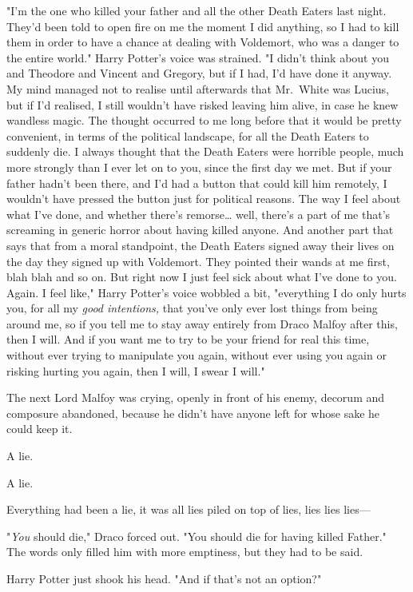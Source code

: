 "I'm the one who killed your father and all the other Death Eaters last night.
They'd been told to open fire on me the moment I did anything, so I had to kill
them in order to have a chance at dealing with Voldemort, who was a danger to
the entire world." Harry Potter's voice was strained. "I didn't think about you
and Theodore and Vincent and Gregory, but if I had, I'd have done it anyway. My
mind managed not to realise until afterwards that Mr.~White was Lucius, but if
I'd realised, I still wouldn't have risked leaving him alive, in case he knew
wandless magic. The thought occurred to me long before that it would be pretty
convenient, in terms of the political landscape, for all the Death Eaters to
suddenly die. I always thought that the Death Eaters were horrible people, much
more strongly than I ever let on to you, since the first day we met. But if
your father hadn't been there, and I'd had a button that could kill him
remotely, I wouldn't have pressed the button just for political reasons. The
way I feel about what I've done, and whether there's remorse{\ldots} well,
there's a part of me that's screaming in generic horror about having killed
anyone. And another part that says that from a moral standpoint, the Death
Eaters signed away their lives on the day they signed up with Voldemort. They
pointed their wands at me first, blah blah and so on. But right now I just feel
sick about what I've done to you. Again. I feel like," Harry Potter's voice
wobbled a bit, "everything I do only hurts you, for all my \emph{good
intentions,} that you've only ever lost things from being around me, so if you
tell me to stay away entirely from Draco Malfoy after this, then I will. And if
you want me to try to be your friend for real this time, without ever trying to
manipulate you again, without ever using you again or risking hurting you
again, then I will, I swear I will."

The next Lord Malfoy was crying, openly in front of his enemy, decorum and
composure abandoned, because he didn't have anyone left for whose sake he could
keep it.

A lie.

A lie.

Everything had been a lie, it was all lies piled on top of lies, lies lies
lies---

"\emph{You} should die," Draco forced out. "You should die for having killed
Father." The words only filled him with more emptiness, but they had to be said.

Harry Potter just shook his head. "And if that's not an option?"

